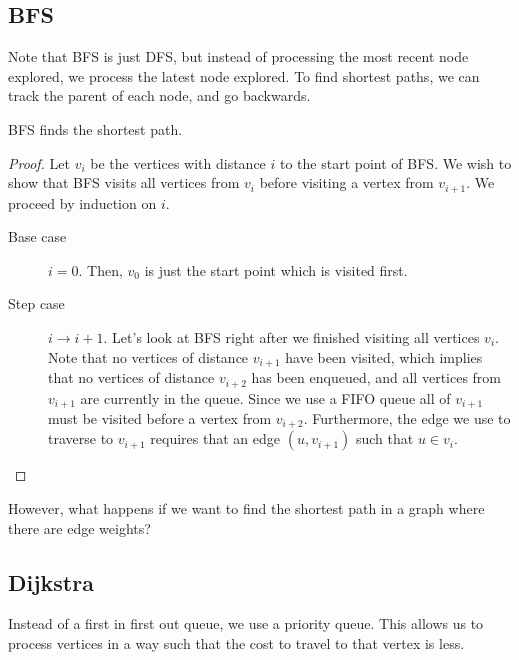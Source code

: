 
\subsection{BFS}

Note that BFS is just DFS, but instead of processing the most recent node explored, we process the latest node explored. To find shortest paths, we can track the parent of each node, and go backwards.

\begin{theorem}
	BFS finds the shortest path.
\end{theorem}
\begin{proof}
	Let \( v_i \) be the vertices with distance \( i \) to the start point of BFS. We wish to show that BFS visits all vertices from \( v_i \) before visiting a vertex from \( v_{i+1} \). We proceed by induction on \( i \).
	\begin{description}
		\item[Base case] \( i=0 \). Then, \( v_0 \) is just the start point which is visited first.
		\item[Step case] \( i \to i + 1\). Let's look at BFS right after we finished visiting all vertices \( v_i \). Note that no vertices of distance \( v_{i+1} \) have been visited, which implies that no vertices of distance \( v_{i+2} \) has been enqueued, and all vertices from \( v_{i+1} \) are currently in the queue. Since we use a FIFO queue all of \( v_{i+1} \) must be visited before a vertex from \( v_{i+2} \). Furthermore, the edge we use to traverse to \( v_{i+1} \) requires that an edge \( (u, v_{i+1}) \) such that \( u \in v_i \).
	\end{description}
\end{proof}

However, what happens if we want to find the shortest path in a graph where there are edge weights?

\subsection{Dijkstra}
Instead of a first in first out queue, we use a priority queue. This allows us to process vertices in a way such that the cost to travel to that vertex is less.

